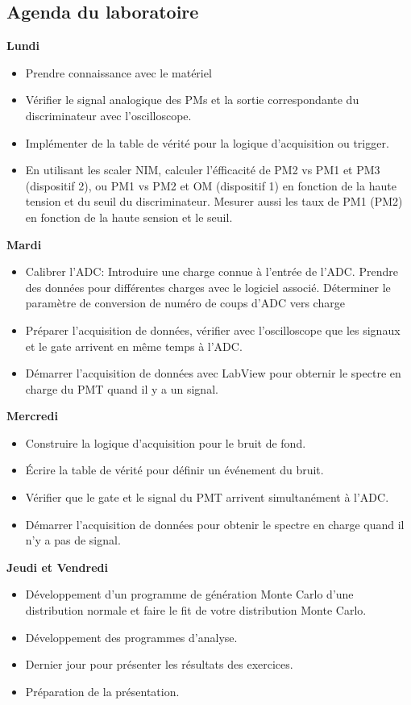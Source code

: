 \subsection{Agenda du laboratoire}
\textbf{Lundi}
\begin{itemize}
\item Prendre connaissance avec le matériel
\item Vérifier le signal analogique des PMs et la sortie correspondante du discriminateur avec l'oscilloscope.
\item Implémenter de la table de vérité pour la logique d'acquisition ou trigger.
\item En utilisant les scaler NIM, calculer l’éfficacité de PM2 vs PM1 et PM3 (dispositif 2), ou PM1 vs PM2 et OM (dispositif 1) en fonction de la haute tension et du seuil du discriminateur. Mesurer aussi les taux de PM1 (PM2) en fonction de la haute sension et le seuil.
\end{itemize}
\vspace{\baselineskip}
\textbf{Mardi}
\begin{itemize}
\item Calibrer l'ADC: Introduire une charge connue à l'entrée de l’ADC. Prendre des données pour différentes charges avec le logiciel associé. Déterminer le paramètre de conversion de numéro de coups d’ADC vers charge
\item Préparer l'acquisition de données, vérifier avec l'oscilloscope que les signaux et le gate arrivent en même temps à l'ADC.
\item Démarrer l'acquisition de données avec LabView pour obternir le spectre en charge du PMT quand il y a un signal.
\end{itemize}
\vspace{\baselineskip}
\textbf{Mercredi}
\begin{itemize}
\item Construire la logique d'acquisition pour le bruit de fond.
\item Écrire la table de vérité pour définir un événement du bruit.
\item Vérifier que le gate et le signal du PMT arrivent simultanément à l'ADC.
\item Démarrer l'acquisition de données pour obtenir le spectre en charge quand il n'y a pas de signal.
\end{itemize}
\vspace{\baselineskip}
\textbf{Jeudi et Vendredi}
\begin{itemize}
\item Développement d'un programme de génération Monte Carlo d'une distribution normale et faire le fit de votre distribution Monte Carlo.
\item Développement des programmes d'analyse.
\item Dernier jour pour présenter les résultats des exercices.
\item Préparation de la présentation.
\end{itemize}

\pagebreak